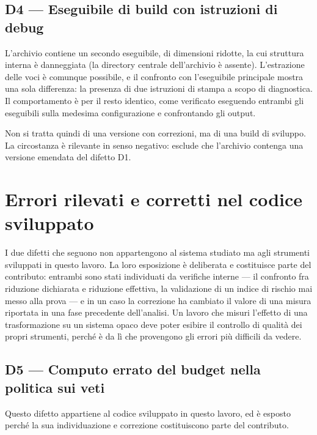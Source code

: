 \subsection{D4 --- Eseguibile di build con istruzioni di debug}\label{sec:d4}

L'archivio contiene un secondo eseguibile, di dimensioni ridotte, la cui struttura interna è
danneggiata (la directory centrale dell'archivio è assente). L'estrazione delle voci è comunque
possibile, e il confronto con l'eseguibile principale mostra una sola differenza: la presenza di
due istruzioni di stampa a scopo di diagnostica. Il comportamento è per il resto identico, come
verificato eseguendo entrambi gli eseguibili sulla medesima configurazione e confrontando gli
output.

Non si tratta quindi di una versione con correzioni, ma di una build di sviluppo. La circostanza
è rilevante in senso negativo: esclude che l'archivio contenga una versione emendata del difetto
D1.

\section{Errori rilevati e corretti nel codice sviluppato}\label{sec:defects-ours}

I due difetti che seguono non appartengono al sistema studiato ma agli strumenti sviluppati in
questo lavoro. La loro esposizione è deliberata e costituisce parte del contributo: entrambi sono
stati individuati da verifiche interne --- il confronto fra riduzione dichiarata e riduzione
effettiva, la validazione di un indice di rischio mai messo alla prova --- e in un caso la
correzione ha cambiato il valore di una misura riportata in una fase precedente dell'analisi. Un
lavoro che misuri l'effetto di una trasformazione su un sistema opaco deve poter esibire il
controllo di qualità dei propri strumenti, perché è da lì che provengono gli errori più difficili
da vedere.

\subsection{D5 --- Computo errato del budget nella politica sui veti}\label{sec:d5}

Questo difetto appartiene al codice sviluppato in questo lavoro, ed è esposto perché la sua
individuazione e correzione costituiscono parte del contributo.


